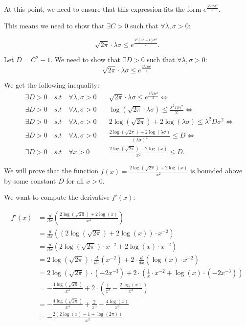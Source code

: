 \documentclass[a4 paper]{article}
\theoremstyle{boldStyle}
\theoremstyle{boldBlueStyle}
\theoremstyle{boldPurpleStyle}
\theoremstyle{boldRedStyle}
\begin{document}
At this point, we need to ensure that this expression fits the form \(e^{\frac{\lambda^2 C^2 \sigma^2}{2}}\). 

This means we need to show that \(\exists C > 0\) such that \(\forall \lambda, \sigma > 0\):

\[
\sqrt{2\pi} \cdot \lambda \sigma \leq e^{\frac{\lambda^2 (C^2 - 1) \sigma^2}{2}}.
\]

Let $D = C^2 - 1$. We need to show that $\exists D > 0$ such that $\forall \lambda, \sigma > 0$:
\[
\sqrt{2\pi} \cdot \lambda \sigma \leq e^{\frac{\lambda^2 D \sigma^2}{2}}
\]

We get the following inequality:
\begin{align*}  
&\exists D > 0 \quad {s.t} \quad \forall \lambda , \sigma >0 \quad &\sqrt{2\pi} \cdot \lambda \sigma \leq e^{\frac{\lambda^2 D \sigma^2}{2}} \iff \\
&\exists D > 0 \quad {s.t} \quad \forall \lambda , \sigma >0 \quad &\log(\sqrt{2\pi} \cdot \lambda \sigma) \leq \frac{\lambda^2 D \sigma^2}{2} \iff \\
&\exists D > 0 \quad {s.t} \quad \forall \lambda , \sigma >0 \quad &2\log(\sqrt{2\pi}) + 2\log(\lambda \sigma) \leq \lambda^2 D \sigma^2 \iff \\
&\exists D > 0 \quad {s.t} \quad \forall \lambda , \sigma >0 \quad &\frac{2\log(\sqrt{2\pi}) + 2\log(\lambda \sigma)}{(\lambda \sigma)^2} \leq D \iff \\
&\exists D > 0 \quad {s.t} \quad \forall x >0  &\frac{2\log(\sqrt{2\pi}) + 2\log(x)}{x^2} \leq D.
\end{align*}

We will prove that the function $f(x) = \frac{2\log(\sqrt{2\pi}) + 2\log(x)}{x^2}$ is bounded above by some constant $D$ for all $x > 0$. 

We want to compute the derivative \(f'(x)\):

\begin{align*}
f'(x) &= \frac{d}{dx} \left(\frac{2\log(\sqrt{2\pi}) + 2\log(x)}{x^2}\right) \\
&= \frac{d}{dx} \left( \left(2\log(\sqrt{2\pi}) + 2\log(x)\right) \cdot x^{-2} \right) \\
&= \frac{d}{dx} \left( 2\log(\sqrt{2\pi}) \cdot x^{-2} + 2\log(x) \cdot x^{-2} \right) \\
&= 2\log(\sqrt{2\pi}) \cdot \frac{d}{dx}(x^{-2}) + 2 \cdot \frac{d}{dx}(\log(x) \cdot x^{-2}) \\
&= 2\log(\sqrt{2\pi}) \cdot (-2x^{-3}) + 2 \cdot \left( \frac{1}{x} \cdot x^{-2} + \log(x) \cdot (-2x^{-3}) \right) \\
&= -\frac{4\log(\sqrt{2\pi})}{x^3} + 2 \cdot \left( \frac{1}{x^3} - \frac{2\log(x)}{x^3} \right) \\
&= -\frac{4\log(\sqrt{2\pi})}{x^3} + \frac{2}{x^3} - \frac{4\log(x)}{x^3} \\
&= -\frac{2(2\log(x) - 1 + \log(2\pi))}{x^3}.
\end{align*}
\end{document}
